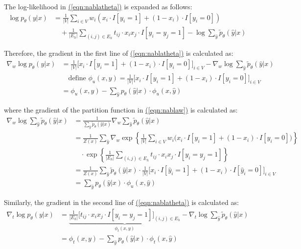 \documentclass[11pt,a4paper]{article}
\begin{document}
The log-likelihood in \hyperref[eqn:nablatheta]{(\ref{eqn:nablatheta})} is expanded as follows:
\begin{align}
\log p_\theta(y|x)&=\frac{1}{|V|}\sum_{i\in V}w_i(x_i\cdot I[y_i=1]+(1-x_i)\cdot I[y_i=0])\nonumber\\
&\quad+\frac{1}{|E_h|}\sum_{(i,j)\in E_h}t_{ij}\cdot x_ix_j\cdot I[y_i=y_j=1]-\log\sum_{\hat{y}}\tilde{p}_\theta(\hat{y}|x)
\end{align}

Therefore, the gradient in the first line of \hyperref[eqn:nablatheta]{(\ref{eqn:nablatheta})} is calculated as:
\begin{align}
\nabla_w\log p_\theta(y|x)&=\frac{1}{|V|}\Big[x_i\cdot I[y_i=1]+(1-x_i)\cdot I[y_i=0]\Big]_{i\in V}-\nabla_w\log\sum_{\hat{y}}\tilde{p}_\theta(\hat{y}|x)\nonumber\\
&\quad\text{define }\phi_u(x,y)=\frac{1}{|V|}\Big[x_i\cdot I[y_i=1]+(1-x_i)\cdot I[y_i=0]\Big]_{i\in V}\nonumber\\
&=\phi_u(x,y)-\sum_{\hat{y}}p_\theta(\hat{y}|x)\cdot\phi_u(x,\hat{y})
\label{eqn:nablaw}
\end{align}

where the gradient of the partition function in \hyperref[eqn:nablaw]{(\ref{eqn:nablaw})} is calculated as:
\begin{align}
\nabla_w\log\sum_{\hat{y}}\tilde{p}_\theta(\hat{y}|x)&=\frac{1}{\sum_{\hat{y}}\tilde{p}_\theta(\hat{y}|x)}\nabla_w\sum_{\hat{y}}\tilde{p}_\theta(\hat{y}|x)\nonumber\\
&=\frac{1}{Z(x)}\sum_{\hat{y}}\nabla_w\exp\left\{\frac{1}{|V|}\sum_{i\in V}w_i\big(x_i\cdot I[y_i=1]+(1-x_i)\cdot I[y_i=0]\big)\right\}\nonumber\\
&\quad\cdot\exp\left\{\frac{1}{|E_h|}\sum_{(i,j)\in E_h}t_{ij}\cdot x_ix_j\cdot I[y_i=y_j=1]\right\}\nonumber\\
&=\frac{1}{Z(x)}\sum_{\hat{y}}\tilde{p}_\theta(\hat{y}|x)\cdot\frac{1}{|V|}\Big[x_i\cdot I[\hat{y}_i=1]+(1-x_i)\cdot I[\hat{y}_i=0]\Big]_{i\in V}\nonumber\\
&=\sum_{\hat{y}}p_\theta(\hat{y}|x)\cdot\phi_u(x,\hat{y})
\end{align}

Similarly, the gradient in the second line of \hyperref[eqn:nablatheta]{(\ref{eqn:nablatheta})} is calculated as:
\begin{align}
\nabla_t\log p_\theta(y|x)&=\underbrace{\frac{1}{|E_h|}\Big[t_{ij}\cdot x_ix_j\cdot I[y_i=y_j=1]\Big]_{(i,j)\in E_h}}_{\phi_t(x,y)}-\nabla_t\log\sum_{\hat{y}}\tilde{p}_\theta(\hat{y}|x)\nonumber\\
&=\phi_t(x,y)-\sum_{\hat{y}}p_\theta(\hat{y}|x)\cdot\phi_t(x,\hat{y})
\label{eqn:nablat}
\end{align}
\end{document}
